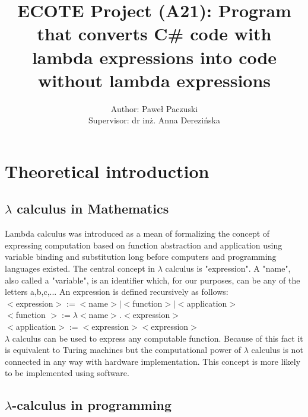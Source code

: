 \documentclass[]{report}
\title{ ECOTE Project (A21):  Program that converts C\# code with lambda expressions into code without lambda expressions}
\author{Author: Paweł Paczuski \\ Supervisor: dr inż. Anna Derezińska}
\begin{document}
    \maketitle
    
    \tableofcontents
    \pagebreak
    
    \chapter{Theoretical introduction}
    \section{$\lambda$ calculus in Mathematics}
    Lambda calculus was introduced as a mean of formalizing the concept of expressing computation based on function abstraction and application using variable binding and substitution long before computers and programming languages existed. \cite{lambddef}
    The central concept in $\lambda$ calculus is "expression". A  "name",  also  called a "variable", is an identifier which, for our purposes, can be any of the letters
    a,b,c,...
    An expression is defined recursively as follows\cite{lambdintro}:\\
    $<$expression$>:=< $name$ >|< $function$ >|< $application$ > $ \\
    $<$function $>:= \lambda < $name$ >.< $expression$ > $\\
    $<$application$>:=<$expression$ >< $expression$ > $\\
    
    $\lambda$  calculus can be used to express any computable function. Because of this fact it is equivalent to Turing machines but the computational power of $\lambda$ calculus is not connected in any way with hardware implementation. This concept is more likely to be implemented using software.
    
    \section{$\lambda$-calculus in programming}
    
\end{document}
